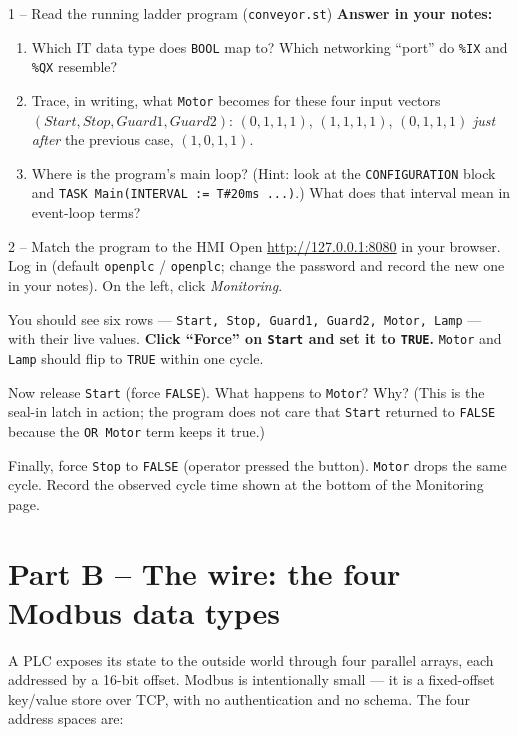 \documentclass[11pt,a4paper]{article}
\begin{document}
\begin{stepbox}{1 -- Read the running ladder program (\texttt{conveyor.st})}
\noindent\textbf{Answer in your notes:}
\begin{enumerate}\setlength{\itemsep}{1pt}
  \item Which IT data type does \texttt{BOOL} map to? Which networking ``port'' do \texttt{\%IX} and \texttt{\%QX} resemble?
  \item Trace, in writing, what \texttt{Motor} becomes for these four input vectors $(Start, Stop, Guard1, Guard2)$: $(0,1,1,1)$, $(1,1,1,1)$, $(0,1,1,1)$ \emph{just after} the previous case, $(1,0,1,1)$.
  \item Where is the program's main loop? (Hint: look at the \texttt{CONFIGURATION} block and \texttt{TASK Main(INTERVAL := T\#20ms ...)}.) What does that interval mean in event-loop terms?
\end{enumerate}
\end{stepbox}

\begin{stepbox}{2 -- Match the program to the HMI}
Open \url{http://127.0.0.1:8080} in your browser. Log in (default \texttt{openplc} / \texttt{openplc}; change the password and record the new one in your notes). On the left, click \emph{Monitoring}.

You should see six rows --- \texttt{Start, Stop, Guard1, Guard2, Motor, Lamp} --- with their live values. \textbf{Click ``Force'' on \texttt{Start} and set it to \texttt{TRUE}.} \texttt{Motor} and \texttt{Lamp} should flip to \texttt{TRUE} within one cycle.

\smallskip
Now release \texttt{Start} (force \texttt{FALSE}). What happens to \texttt{Motor}? Why? (This is the seal-in latch in action; the program does not care that \texttt{Start} returned to \texttt{FALSE} because the \texttt{OR Motor} term keeps it true.)

\smallskip
Finally, force \texttt{Stop} to \texttt{FALSE} (operator pressed the button). \texttt{Motor} drops the same cycle. Record the observed cycle time shown at the bottom of the Monitoring page.
\end{stepbox}

\section*{Part B -- The wire: the four Modbus data types}

A PLC exposes its state to the outside world through four parallel arrays, each addressed by a 16-bit offset. Modbus is intentionally small --- it is a fixed-offset key/value store over TCP, with no authentication and no schema. The four address spaces are:
\end{document}
